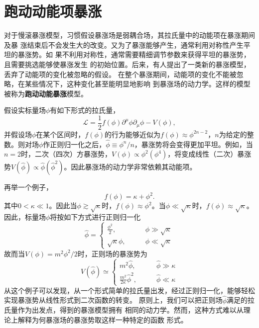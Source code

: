 \section{跑动动能项暴涨}
对于慢滚暴涨模型，习惯假设暴涨场是弱耦合场，其拉氏量中的动能项在暴涨期间及暴
涨结束后不会发生大的改变。又为了暴涨能够产生，通常利用对称性产生平坦的暴涨势。如
果不利用对称性，通常需要精细调节参数来获得平坦的暴涨势，且需要挑选能够使暴涨发生
的初始位置。后来，有人提出了一类新的暴涨模型，丢弃了动能项的变化被忽略的假设。
在整个暴涨期间，动能项的变化不能被忽略，在某些情况下，这种变化甚至能明显地影响
到暴涨场的动力学。这样的模型被称为\textbf{跑动动能暴涨}模型。

假设实标量场$\phi$有如下形式的拉氏量，
\begin{equation}
  \mathcal{L} =
  \frac{1}{2}f(\phi)\partial^{\mu}\phi\partial_{\mu}\phi-V(\phi),
\end{equation}
并假设场$\phi$在某个区间时，$f(\phi)$的行为能够近似为$f(\phi)\approx
\phi^{2n-2}$，$n$为给定的整数。则对场$\phi$作正则归一化之后，$\hat{\phi}\equiv
\phi^{n}/n$，暴涨势将会变得更加平坦。例如，当$n=2$时，二次（四次）方暴涨势，$V(\phi)\propto
\phi^2(\phi^{4})$，将变成线性（二次）暴涨势$V(\hat{\phi})\propto
\hat{\phi}(\hat{\phi}^2)$。因此暴涨场的动力学非常依赖其动能项。

再举一个例子，
\begin{equation}
  f(\phi) = \kappa + \phi^2. 
\end{equation}
其中$0 < \kappa \ll 1$。因此当$\phi \gtrsim \sqrt{\kappa}$时，$f(\phi)
\approx \phi^2$。当$\phi \ll \sqrt{\kappa}$时，$f(\phi)\approx
\sqrt{\kappa}$。因此，标量场$\phi$将按如下方式进行正则归一化
\begin{equation}
  \hat{\phi} = 
  \begin{cases}
    \frac{\phi^2}{2}, \qquad & \phi \gg \sqrt{\kappa} \\
    \sqrt{\kappa}\phi,\qquad & \phi \ll \sqrt{\kappa}
  \end{cases}
\end{equation}
故而当$V(\phi)=m^2\phi^2/ 2$时，正则场的暴涨势为
\begin{equation}
  V(\hat{\phi}) \simeq 
  \begin{cases}
    m^2\hat{\phi},\qquad & \hat{\phi} \gg \kappa \\
    \frac{m^2}{2\kappa} \hat{\phi}^2,\qquad & \hat{\phi} \ll \kappa
  \end{cases}
\end{equation}
从这个例子可以发现，从一个形式简单的拉氏量出发，经过正则归一化，能够轻松实现暴涨势从线性形式到二次函数的转变。
原则上，我们可以把正则场$\hat{\phi}$满足的拉氏量作为出发点，得到的暴涨模型拥有
相同的动力学。然而，这种方式难以从理论上解释为何暴涨场的暴涨势取这样一种特定的函数
形式。


